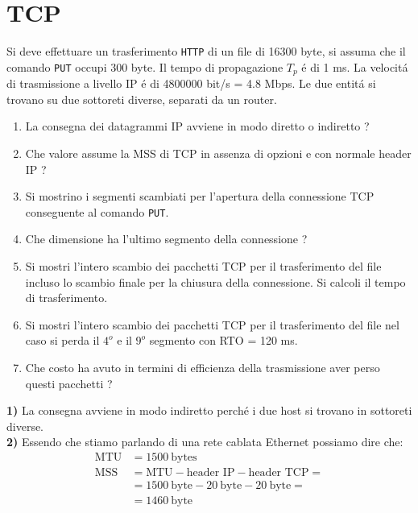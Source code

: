 \documentclass{article}
\def\code#1{\texttt{#1}}
\newenvironment{homeworkProblem}[1][-1]{
    \section{TCP}
}{}
\begin{document}
\begin{homeworkProblem}
	Si deve effettuare un trasferimento \code{HTTP} di un file di 16300 byte, si assuma che il comando \code{PUT} occupi 300 
	byte. Il tempo di propagazione \(T_p\) \'e di 1 ms.
	La velocit\'a di trasmissione a livello IP \'e di 4800000 bit/s = 4.8 Mbps. Le due entit\'a si trovano su due sottoreti 
	diverse, separati da un router.

    \begin{enumerate}[noitemsep]
        \item La consegna dei datagrammi IP avviene in modo diretto o indiretto ?
        \item Che valore assume la MSS di TCP in assenza di opzioni e con normale header IP ?
        \item Si mostrino i segmenti scambiati per l'apertura della connessione TCP conseguente al comando \code{PUT}.
        \item Che dimensione ha l'ultimo segmento della connessione ?
        \item Si mostri l'intero scambio dei pacchetti TCP per il trasferimento del file incluso lo scambio finale per la 
              chiusura della connessione. Si calcoli il tempo di trasferimento.
        \item Si mostri l'intero scambio dei pacchetti TCP per il trasferimento del file nel caso si perda il \(4^o\) e il 
              \(9^o\) segmento con RTO = 120 ms.
        \item Che costo ha avuto in termini di efficienza della trasmissione aver perso questi pacchetti ?
    \end{enumerate}

    \textbf{1)}
    La consegna avviene in modo indiretto perch\'e i due host si trovano in sottoreti diverse.
    \\

    \textbf{2)}
    Essendo che stiamo parlando di una rete cablata Ethernet possiamo dire che:
    \[
        \begin{split}
            \text{MTU} &= 1500\ \text{bytes}
            \\
            \text{MSS} &= \text{MTU} - \text{header IP} - \text{header TCP} =
            \\
            &= 1500\ \text{byte} - 20\ \text{byte} - 20\ \text{byte} =
            \\
            &= 1460\ \text{byte}
        \end{split}
    \]
    \\


\end{homeworkProblem}
\end{document}
